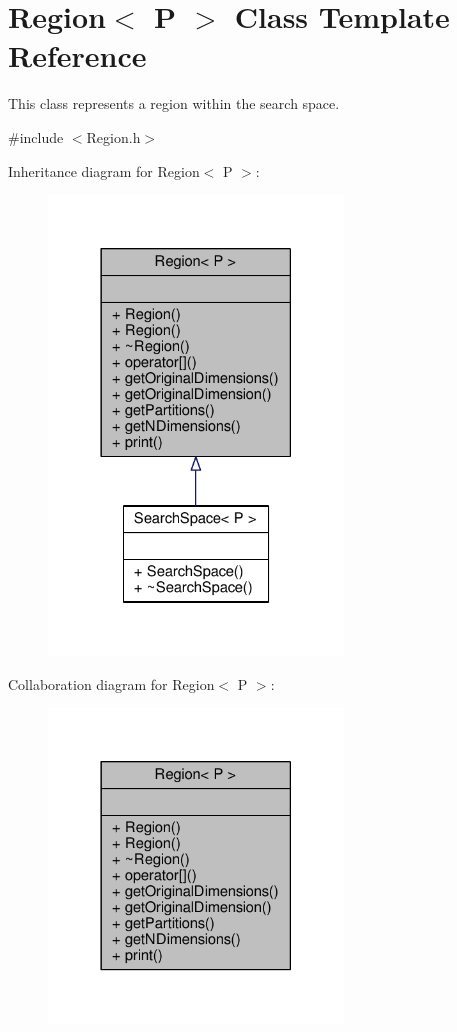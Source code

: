 \hypertarget{classRegion}{}\section{Region$<$ P $>$ Class Template Reference}
\label{classRegion}


This class represents a region within the search space.  




{\ttfamily \#include $<$Region.\+h$>$}



Inheritance diagram for Region$<$ P $>$\+:
\nopagebreak
\begin{figure}[H]
\begin{center}
\leavevmode
\includegraphics[width=222pt]{classRegion__inherit__graph}
\end{center}
\end{figure}


Collaboration diagram for Region$<$ P $>$\+:
\nopagebreak
\begin{figure}[H]
\begin{center}
\leavevmode
\includegraphics[width=222pt]{classRegion__coll__graph}
\end{center}
\end{figure}
